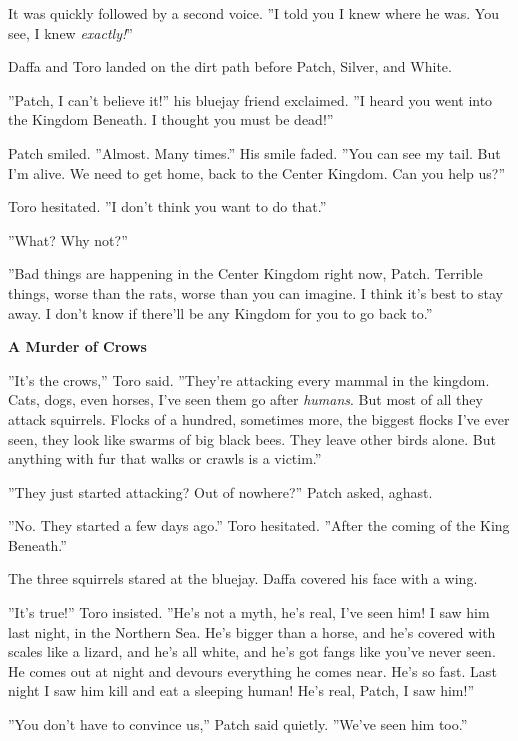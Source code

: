 \documentclass[11pt]{article}
\begin{document}
 It was quickly followed by a second voice. ''I told you I knew where he was. You see, I knew {\it exactly!}''\par
 Daffa and Toro landed on the dirt path before Patch, Silver, and White.\par
 ''Patch, I can't believe it!'' his bluejay friend exclaimed. ''I heard you went into the Kingdom Beneath. I thought you must be dead!''\par
 Patch smiled. ''Almost. Many times.'' His smile faded. ''You can see my tail. But I'm alive. We need to get home, back to the Center Kingdom. Can you help us?''\par
 Toro hesitated. ''I don't think you want to do that.''\par
 ''What? Why not?''\par
 ''Bad things are happening in the Center Kingdom right now, Patch. Terrible things, worse than the rats, worse than you can imagine. I think it's best to stay away. I don't know if there'll be any Kingdom for you to go back to.''\par
\par
{\bf A Murder of Crows\par
}\par
 ''It's the crows,'' Toro said. ''They're attacking every mammal in the kingdom. Cats, dogs, even horses, I've seen them go after {\it humans}. But most of all they attack squirrels. Flocks of a hundred, sometimes more, the biggest flocks I've ever seen, they look like swarms of big black bees. They leave other birds alone. But anything with fur that walks or crawls is a victim.''\par
 ''They just started attacking? Out of nowhere?'' Patch asked, aghast.\par
 ''No. They started a few days ago.'' Toro hesitated. ''After the coming of the King Beneath.''\par
 The three squirrels stared at the bluejay. Daffa covered his face with a wing.\par
 ''It's true!'' Toro insisted. ''He's not a myth, he's real, I've seen him! I saw him last night, in the Northern Sea. He's bigger than a horse, and he's covered with scales like a lizard, and he's all white, and he's got fangs like you've never seen. He comes out at night and devours everything he comes near. He's so fast. Last night I saw him kill and eat a sleeping human! He's real, Patch, I saw him!''\par
 ''You don't have to convince us,'' Patch said quietly. ''We've seen him too.''\par
\end{document}
